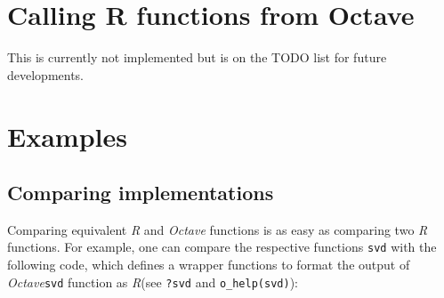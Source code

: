 \documentclass[english,10pt,a4paper]{article}\usepackage[]{graphicx}\usepackage[]{color}
\let\proglang=\textit
\let\code=\texttt
\newcommand{\R}{\proglang{R}\xspace}
\newcommand{\octave}{\proglang{Octave}\xspace}
\begin{document}
\section{Calling R functions from Octave}

This is currently not implemented but is on the TODO list for future
developments.

\section{Examples}
\subsection{Comparing implementations}

Comparing equivalent \R and \octave functions is as easy as comparing two \R
functions.
For example, one can compare the respective functions \code{svd} with the
following code, which defines a wrapper functions to format the output of
\octave \code{svd} function as \R (see \code{?svd} and \code{o\_help(svd)}):
\end{document}
